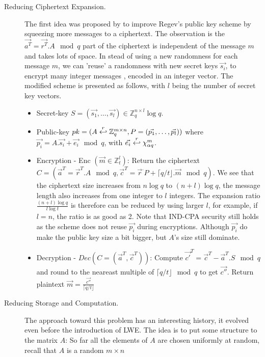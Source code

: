 \begin{description}
\item[Reducing Ciphertext Expansion.] The first idea was proposed by
  \cite{peikert2008framework} to improve Regev's public key scheme by squeezing
  more messages to a ciphertext.  The observation is the
  $\vec{a^T} = \vec{r^T}. A \mod q$ part of the ciphertext is independent of the
  message $m$ and takes lots of space. In stead of using a new randomness for
  each message $m$, we can 'reuse' a randomness with new secret keys
  $\vec{s_i}$, to encrypt many integer messages , encoded in an integer
  vector. The modified scheme is presented as follows, with $l$ being the number
  of secret key vectors.
  \begin{itemize}
  \item Secret-key
    $S = (\vec{s_1}, \dots, \vec{s_l}) \in \mathbb{Z}_q^{n \times l} \log q$.
  \item Public-key
    $pk = (A \stackrel{r}{\hookleftarrow} \mathbb{Z}_q^{m \times n},P=(\vec{p_1}, \dots,
    \vec{p_l}))$ where $\vec{p_i} = A.\vec{s_i} + \vec{e_i} \mod q$, with
    $\vec{e_i} \stackrel{r}{\hookleftarrow} \chi_{\alpha q}^m$.
  \item Encryption - Enc $(\vec{m} \in \mathbb{Z}_t^l)$: Return the ciphertext
    $C = (\vec{a}^T= \vec{r}^T.A \mod q, \vec{c}^T = \vec{r}^.P + \lceil q/t
    \rfloor . \vec{m} \mod q)$. We see that the ciphertext size increases from
    $n\log q$ to $(n+l)\log q$, the message length also increases from one
    integer to $l$ integers. The expansion ratio $\frac{(n+l)\log q}{l \log t}$
    is therefore can be reduced by using larger $l$, for example, if $l=n$, the
    ratio is as good as 2. Note that IND-CPA security still holds as the scheme
    does not reuse $\vec{p_i}$ during encryptions. Although $\vec{p_i}$ do make
    the public key size a bit bigger, but $A$'s size still dominate.
  \item Decryption - $Dec(C = (\vec{a}^T, \vec{c}^T))$: Compute
    $\vec{c'}^T = \vec{c}^T - \vec{a}^T.S \mod q$ and round to the neareast
    multiple of $\lceil q/t \rfloor \mod q$ to get $\vec{c''}$. Return plaintext
    $\vec{m} = \frac{\vec{c''}}{\lceil q/t \rfloor}$
  \end{itemize}
\item [Reducing Storage and Computation.] The approach toward this problem has
  an interesting history, it evolved even before the introduction of LWE. The
  idea is to put some structure to the matrix $A$: So far all the elements of
  $A$ are chosen uniformly at random, recall that $A$ is a random $m \times n$

\end{description}
